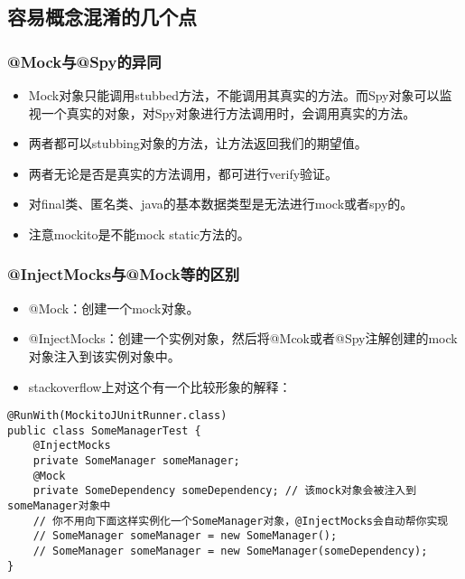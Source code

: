 \documentclass[9pt, b5paper]{article}
\begin{document}
\subsection{容易概念混淆的几个点}
\label{sec-1-2}
\subsubsection{@Mock与@Spy的异同}
\label{sec-1-2-1}
\begin{itemize}
\item Mock对象只能调用stubbed方法，不能调用其真实的方法。而Spy对象可以监视一个真实的对象，对Spy对象进行方法调用时，会调用真实的方法。
\item 两者都可以stubbing对象的方法，让方法返回我们的期望值。
\item 两者无论是否是真实的方法调用，都可进行verify验证。
\item 对final类、匿名类、java的基本数据类型是无法进行mock或者spy的。
\item 注意mockito是不能mock static方法的。
\end{itemize}
\subsubsection{@InjectMocks与@Mock等的区别}
\label{sec-1-2-2}
\begin{itemize}
\item @Mock：创建一个mock对象。
\item @InjectMocks：创建一个实例对象，然后将@Mcok或者@Spy注解创建的mock对象注入到该实例对象中。
\item stackoverflow上对这个有一个比较形象的解释：
\end{itemize}
\begin{verbatim}
@RunWith(MockitoJUnitRunner.class)
public class SomeManagerTest {
    @InjectMocks
    private SomeManager someManager;
    @Mock
    private SomeDependency someDependency; // 该mock对象会被注入到someManager对象中
    // 你不用向下面这样实例化一个SomeManager对象，@InjectMocks会自动帮你实现
    // SomeManager someManager = new SomeManager();    
    // SomeManager someManager = new SomeManager(someDependency);
}
\end{verbatim}
\end{document}

